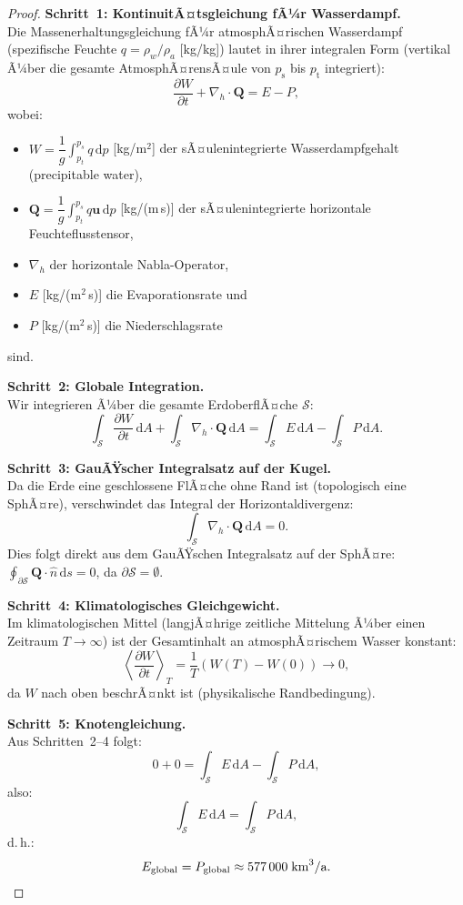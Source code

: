 ﻿\documentclass[a4paper,12pt]{article}
\theoremstyle{definition}
\begin{document}
\begin{proof}
  \textbf{Schritt~1: KontinuitÃ¤tsgleichung fÃ¼r Wasserdampf.}\\
  Die Massenerhaltungsgleichung fÃ¼r atmosphÃ¤rischen Wasserdampf (spezifische
  Feuchte $q = \rho_w / \rho_a$ [kg/kg]) lautet in ihrer integralen Form
  (vertikal Ã¼ber die gesamte AtmosphÃ¤rensÃ¤ule von $p_\mathrm{s}$ bis $p_\mathrm{t}$
  integriert):
  \[
    \frac{\partial W}{\partial t} + \nabla_h \cdot \mathbf{Q}
    = E - P,
  \]
  wobei:
  \begin{itemize}
    \item $W = \dfrac{1}{g}\displaystyle\int_{p_t}^{p_s} q\, \mathrm{d}p$
      [kg/m$^2$] der sÃ¤ulenintegrierte Wasserdampfgehalt (precipitable water),
    \item $\mathbf{Q} = \dfrac{1}{g}\displaystyle\int_{p_t}^{p_s} q\mathbf{u}\, \mathrm{d}p$
      [kg/(m\,s)] der sÃ¤ulenintegrierte horizontale Feuchteflusstensor,
    \item $\nabla_h$ der horizontale Nabla-Operator,
    \item $E$ [kg/(m$^2$\,s)] die Evaporationsrate und
    \item $P$ [kg/(m$^2$\,s)] die Niederschlagsrate
  \end{itemize}
  sind.

  \textbf{Schritt~2: Globale Integration.}\\
  Wir integrieren Ã¼ber die gesamte ErdoberflÃ¤che $\mathcal{S}$:
  \[
    \int_\mathcal{S} \frac{\partial W}{\partial t}\, \mathrm{d}A
    + \int_\mathcal{S} \nabla_h \cdot \mathbf{Q}\, \mathrm{d}A
    = \int_\mathcal{S} E\, \mathrm{d}A - \int_\mathcal{S} P\, \mathrm{d}A.
  \]

  \textbf{Schritt~3: GauÃŸscher Integralsatz auf der Kugel.}\\
  Da die Erde eine geschlossene FlÃ¤che ohne Rand ist (topologisch eine
  SphÃ¤re), verschwindet das Integral der Horizontaldivergenz:
  \[
    \int_\mathcal{S} \nabla_h \cdot \mathbf{Q}\, \mathrm{d}A = 0.
  \]
  Dies folgt direkt aus dem GauÃŸschen Integralsatz auf der SphÃ¤re:
  $\oint_{\partial \mathcal{S}} \mathbf{Q} \cdot \hat{n}\, \mathrm{d}s = 0$,
  da $\partial \mathcal{S} = \emptyset$.

  \textbf{Schritt~4: Klimatologisches Gleichgewicht.}\\
  Im klimatologischen Mittel (langjÃ¤hrige zeitliche Mittelung Ã¼ber einen
  Zeitraum $T \to \infty$) ist der Gesamtinhalt an atmosphÃ¤rischem Wasser
  konstant:
  \[
    \left\langle \frac{\partial W}{\partial t} \right\rangle_T
    = \frac{1}{T}\left(W(T) - W(0)\right) \longrightarrow 0,
  \]
  da $W$ nach oben beschrÃ¤nkt ist (physikalische Randbedingung).

  \textbf{Schritt~5: Knotengleichung.}\\
  Aus Schritten~2--4 folgt:
  \[
    0 + 0 = \int_\mathcal{S} E\, \mathrm{d}A - \int_\mathcal{S} P\, \mathrm{d}A,
  \]
  also:
  \[
    \int_\mathcal{S} E\, \mathrm{d}A = \int_\mathcal{S} P\, \mathrm{d}A,
  \]
  d.\,h.:
  \[
    E_\mathrm{global} = P_\mathrm{global} \approx 577\,000\;\text{km}^3/\text{a}. \qedhere
  \]
\end{proof}
\end{document}
